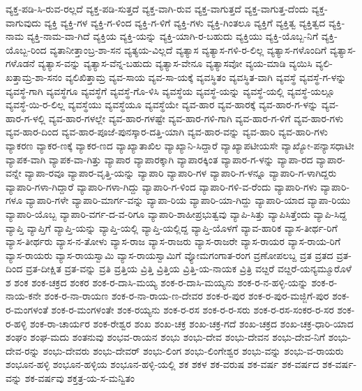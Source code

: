 ವ್ಯಕ್ತ-ಪಡಿ-ಸಿ-ರುವ-ರಲ್ಲದೆ
ವ್ಯಕ್ತ-ಪಡಿ-ಸುತ್ತದೆ
ವ್ಯಕ್ತ-ವಾಗಿ-ರುವ
ವ್ಯಕ್ತ-ವಾಗುತ್ತದೆ
ವ್ಯಕ್ತ-ವಾಗುತ್ತ-ದೆಂದು
ವ್ಯಕ್ತ-ವಾಗುವುದು
ವ್ಯಕ್ತಿ
ವ್ಯಕ್ತಿ-ಗಳ
ವ್ಯಕ್ತಿ-ಗ-ಳಿಂದ
ವ್ಯಕ್ತಿ-ಗ-ಳಿಗೆ
ವ್ಯಕ್ತಿ-ಗಳು
ವ್ಯಕ್ತಿ-ಗಿಂತಲೂ
ವ್ಯಕ್ತಿಗೆ
ವ್ಯಕ್ತಿತ್ವ
ವ್ಯಕ್ತಿತ್ವದ
ವ್ಯಕ್ತಿ-ನಾಮ
ವ್ಯಕ್ತಿ-ನಾಮ-ವಾ-ಗಿದೆ
ವ್ಯಕ್ತಿಯ
ವ್ಯಕ್ತಿ-ಯನ್ನು
ವ್ಯಕ್ತಿ-ಯಾಗಿ-ರ-ಬಹುದು
ವ್ಯಕ್ತಿಯು
ವ್ಯಕ್ತಿ-ಯೊಬ್ಬ-ನಿಗೆ
ವ್ಯಕ್ತಿ-ಯೊಬ್ಬ-ರಿಂದ
ವ್ಯತಾನೀತ್ತಾಂಬ್ರ-ಶಾ-ಸನ
ವ್ಯತ್ಯಯ-ವಿಲ್ಲದೆ
ವ್ಯತ್ಯಾಸ
ವ್ಯತ್ಯಾಸ-ಗಳಿ-ರ-ಲಿಲ್ಲ
ವ್ಯತ್ಯಾಸ-ಗಳೊಂದಿಗೆ
ವ್ಯತ್ಯಾಸ-ಗಳೊಡನೆ
ವ್ಯತ್ಯಾಸ-ವನ್ನು
ವ್ಯತ್ಯಾಸ-ವೆನ್ನ-ಬಹುದು
ವ್ಯತ್ಯಾಸ-ವೇನೂ
ವ್ಯತ್ಯಾಸವೋ
ವ್ಯಯ-ಮಾಡಿ
ವ್ಯಯಿಸಿ
ವ್ಯಲಿ-ಖತ್ತಾಮ್ರ-ಶಾ-ಸನಂ
ವ್ಯಲಿಖಿತ್ತಾಮ್ರ
ವ್ಯವ-ಸಾಯ
ವ್ಯವ-ಸಾ-ಯಕ್ಕೆ
ವ್ಯವಸ್ಥಿತಂ
ವ್ಯವಸ್ಥಿತ-ವಾಗಿ
ವ್ಯವಸ್ಥೆ
ವ್ಯವಸ್ಥೆ-ಗ-ಳನ್ನು
ವ್ಯವಸ್ಥೆ-ಗಾಗಿ
ವ್ಯವಸ್ಥೆಗೂ
ವ್ಯವಸ್ಥೆಗೆ
ವ್ಯವಸ್ಥೆ-ಗೊ-ಳಿಸಿ
ವ್ಯವಸ್ಥೆಯ
ವ್ಯವಸ್ಥೆ-ಯನ್ನು
ವ್ಯವಸ್ಥೆ-ಯಲ್ಲಿ
ವ್ಯವಸ್ಥೆ-ಯಲ್ಲೂ
ವ್ಯವಸ್ಥೆ-ಯಿ-ರ-ಲಿಲ್ಲ
ವ್ಯವಸ್ಥೆಯು
ವ್ಯವಸ್ಥೆಯೂ
ವ್ಯವಸ್ಥೆಯೇ
ವ್ಯವ-ಹಾರ
ವ್ಯವ-ಹಾರಕ್ಕೆ
ವ್ಯವ-ಹಾರ-ಗ-ಳನ್ನು
ವ್ಯವ-ಹಾರ-ಗ-ಳಲ್ಲಿ
ವ್ಯವ-ಹಾರ-ಗಳಲ್ಲೇ
ವ್ಯವ-ಹಾರ-ಗಳಷ್ಟೇ
ವ್ಯವ-ಹಾರ-ಗಳಿ-ಗಾಗಿ
ವ್ಯವ-ಹಾರ-ಗ-ಳಿಗೆ
ವ್ಯವ-ಹಾರ-ಗಳು
ವ್ಯವ-ಹಾರ-ದಿಂದ
ವ್ಯವ-ಹಾರ-ಪೂಜೆ-ಪುನಸ್ಕಾರ-ದತ್ತಿ-ಯಾಗಿ
ವ್ಯವ-ಹಾರ-ವನ್ನು
ವ್ಯವ-ಹಾರಿ
ವ್ಯವ-ಹಾರಿ-ಗಳು
ವ್ಯಾಕರಣ
ವ್ಯಾಕರ-ಣಕ್ಕೆ
ವ್ಯಾಕರ-ಣದ
ವ್ಯಾಖ್ಯಾತಾಖಿಲ
ವ್ಯಾಖ್ಯಾನಿ-ಸಿದ್ದಾರೆ
ವ್ಯಾಖ್ಯಾಪಟೀಯಸೇ
ವ್ಯಾಖ್ಯೋ-ಪನ್ಯಾಸಧಾಟೀ
ವ್ಯಾಪಕ-ವಾಗಿ
ವ್ಯಾಪಕ-ವಾ-ಗಿತ್ತು
ವ್ಯಾಪಾರ
ವ್ಯಾಪಾರಕ್ಕಾಗಿ
ವ್ಯಾಪಾರಕ್ಕಿಂತ
ವ್ಯಾಪಾರ-ಗ-ಳನ್ನು
ವ್ಯಾಪಾ-ರದ
ವ್ಯಾಪಾರ-ವನ್ನೇ
ವ್ಯಾಪಾ-ರವೂ
ವ್ಯಾಪಾರ-ವೃತ್ತಿ-ಯನ್ನು
ವ್ಯಾಪಾರಿ
ವ್ಯಾಪಾರಿ-ಗಳ
ವ್ಯಾಪಾರಿ-ಗ-ಳನ್ನೂ
ವ್ಯಾಪಾರಿ-ಗ-ಳಾಗಿದ್ದರು
ವ್ಯಾಪಾರಿ-ಗಳಾ-ಗಿದ್ದಾರೆ
ವ್ಯಾಪಾರಿ-ಗಳಾ-ಗಿದ್ದು
ವ್ಯಾಪಾರಿ-ಗ-ಳಿಂದ
ವ್ಯಾಪಾರಿ-ಗಳಿ-ವ-ರೆಂದು
ವ್ಯಾಪಾರಿ-ಗಳು
ವ್ಯಾಪಾರಿ-ಗಳೂ
ವ್ಯಾಪಾರಿ-ಗಳೇ
ವ್ಯಾಪಾರಿ-ಮಾರ್ಗ-ವನ್ನು
ವ್ಯಾಪಾ-ರಿಯ
ವ್ಯಾಪಾರಿ-ಯಾ-ಗಿದ್ದು
ವ್ಯಾಪಾರಿ-ಯಾದ
ವ್ಯಾಪಾ-ರಿಯು
ವ್ಯಾಪಾರಿ-ಯೊಬ್ಬ
ವ್ಯಾಪಾರಿ-ವರ್ಗ-ದ-ವ-ರಿಗೂ
ವ್ಯಾಪಾರಿ-ಶಾಹೀಪ್ರಭುತ್ವವು
ವ್ಯಾಪಿ-ಸಿತ್ತು
ವ್ಯಾಪಿಸಿತ್ತೆಂದು
ವ್ಯಾಪಿ-ಸಿದ್ದ
ವ್ಯಾಪ್ತಿ
ವ್ಯಾಪ್ತಿಗೆ
ವ್ಯಾಪ್ತಿ-ಯನ್ನು
ವ್ಯಾಪ್ತಿ-ಯಲ್ಲಿ
ವ್ಯಾಪ್ತಿ-ಯಲ್ಲಿದ್ದ
ವ್ಯಾಪ್ತಿ-ಯೊಳಗೆ
ವ್ಯಾವ-ಹಾರಿಕ
ವ್ಯಾಸ-ತೀರ್ಥ-ರಿಗೆ
ವ್ಯಾಸ-ತೀರ್ಥರು
ವ್ಯಾಸ-ನ-ತೋಳು
ವ್ಯಾಸ-ರಾಜ
ವ್ಯಾಸ-ರಾಜರು
ವ್ಯಾಸ-ರಾಜರೇ
ವ್ಯಾಸ-ರಾಯರ
ವ್ಯಾಸ-ರಾಯ-ರಿಗೆ
ವ್ಯಾಸ-ರಾಯರು
ವ್ಯಾಸ-ರಾಯಸ್ವಾಮಿ
ವ್ಯಾಸ-ರಾಯಸ್ವಾಮಿಗೆ
ವ್ಯೋಮಗಂಗಾತ-ರಂಗ
ವ್ರಣೋಪಲಬ್ದ
ವ್ರತ
ವ್ರತದ
ವ್ರತ-ದಿಂದ
ವ್ರತ-ದೀಕ್ಷಿತ
ವ್ರತ-ವನ್ನು
ವ್ರತಿ
ವ್ರತ್ತಿಯ
ವ್ರಿತ್ತಿ
ವ್ರಿತ್ತಿಯ
ವ್ರಿತ್ತಿ-ಯ-ನಾಯಕ
ವ್ರಿತ್ರಿ
ವೞ್ದರೆ
ವೞ್ದರೆ-ಯನ್ಯಮ್ಮೂರೊಳೆ
ಶ
ಶಂಕ
ಶಂಕ-ಚಕ್ರದ
ಶಂಕರ
ಶಂಕ-ರ-ದಾಸಿ-ಮಯ್ಯ
ಶಂಕ-ರ-ದಾಸಿ-ಮಯ್ಯನು
ಶಂಕ-ರ-ನ-ಹಳ್ಳಿ-ಯನ್ನು
ಶಂಕ-ರ-ನಾಯ-ಕನೇ
ಶಂಕ-ರ-ನಾ-ರಾಯಣ
ಶಂಕ-ರ-ನಾ-ರಾಯ-ಣ-ದೇವರ
ಶಂಕ-ರ-ಪುರ
ಶಂಕ-ರ-ಪುರ-ಮಜ್ಜಿಗೆ-ಪುರ
ಶಂಕ-ರ-ಮಂಗಳಂತೆ
ಶಂಕ-ರ-ಮಂಗಳಂತೇ
ಶಂಕ-ರಯ್ಯನು
ಶಂಕ-ರ-ರಸ
ಶಂಕ-ರ-ರ-ಸರು
ಶಂಕ-ರ-ರಸ-ಸಂಕರ-ರ-ಸರ
ಶಂಕ-ರ-ಹಳ್ಳಿ
ಶಂಕ-ರಾ-ಚಾರ್ಯರ
ಶಂಕ-ರೇಶ್ವರ
ಶಂಖ
ಶಂಖ-ಚಕ್ರ
ಶಂಖ-ಚಕ್ರ-ಗದೆ
ಶಂಖ-ಚಕ್ರದ
ಶಂಖ-ಚಕ್ರ-ಧಾರಿ-ಯಾದ
ಶಂಘಂ
ಶಂಘ-ಮದು
ಶಂತನುವು
ಶಂಭವ-ರಾಯನ
ಶಂಭು
ಶಂಭು-ದೇವ
ಶಂಭು-ದೇವನ
ಶಂಭು-ದೇವ-ನಿಗೆ
ಶಂಭು-ದೇವ-ರನ್ನು
ಶಂಭು-ದೇವರು
ಶಂಭು-ದೇವರ್
ಶಂಭು-ಲಿಂಗ
ಶಂಭು-ಲಿಂಗೇಶ್ವರ
ಶಂಭು-ವನ್ನು
ಶಂಭು-ವ-ರಾಯರು
ಶಂಭೂನ-ಹಳ್ಳಿ
ಶಂಭೂನ-ಹಳ್ಳಿಯ
ಶಂಭೂನ-ಹಳ್ಳಿ-ಯಲ್ಲಿ
ಶಕ
ಶಕಳ
ಶಕ-ವರುಷ
ಶಕ-ವರ್ಷ
ಶಕ-ವರ್ಷದ
ಶಕ-ವರ್ಷ-ವನ್ನು
ಶಕ-ವರ್ಷವು
ಶಕ್ತತ್ರ-ಯ-ಸ-ಮನ್ವಿತಂ
